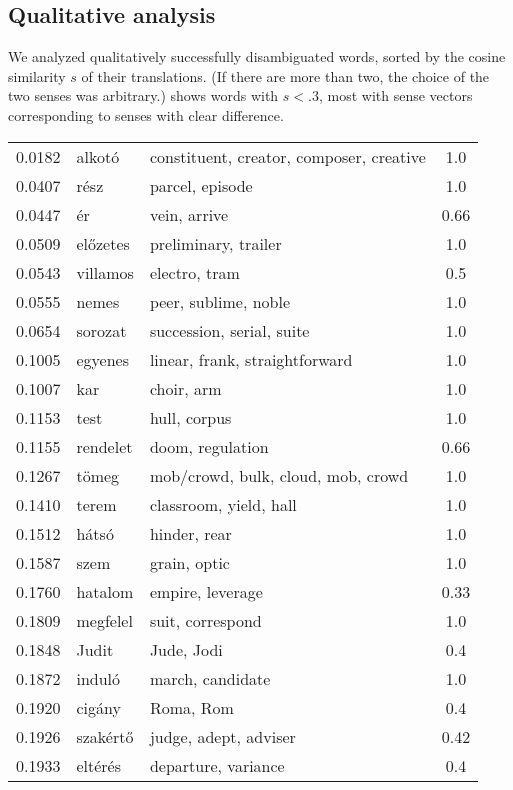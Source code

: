 \documentclass[11pt]{article}
\begin{document}
\subsection{Qualitative analysis}

We analyzed qualitatively successfully disambiguated words, sorted by the
cosine similarity $s$ of their translations.  (If there are more than two, the
choice of the two senses was arbitrary.)  shows words with
$s<.3$, most with sense vectors corresponding to senses with clear difference.

\begin{table*}
  \begin{tabular}{cllc}
  0.0182 & alkotó 	& constituent, creator, composer, creative	&  1.0 \\
  0.0407 & rész 	& parcel, episode	&  1.0 \\
  0.0447 & ér 	& vein, arrive	&  0.66 \\
  0.0509 & előzetes 	& preliminary, trailer	&  1.0 \\
  0.0543 & villamos 	& electro, tram	&  0.5 \\
  0.0555 & nemes 	& peer, sublime, noble	&  1.0 \\
  0.0654 & sorozat 	& succession, serial, suite	&  1.0 \\
  0.1005 & egyenes 	& linear, frank, straightforward	&  1.0 \\
  0.1007 & kar 	& choir, arm	&  1.0 \\
  0.1153 & test 	& hull, corpus	&  1.0 \\
  0.1155 & rendelet 	& doom, regulation	&  0.66 \\
  0.1267 & tömeg 	& mob/crowd, bulk, cloud, mob, crowd	&  1.0 \\
  0.1410 & terem 	& classroom, yield, hall	&  1.0 \\
  0.1512 & hátsó 	& hinder, rear	&  1.0 \\
  0.1587 & szem 	& grain, optic	&  1.0 \\
  0.1760 & hatalom 	& empire, leverage	&  0.33 \\
  0.1809 & megfelel 	& suit, correspond	&  1.0 \\
  0.1848 & Judit 	& Jude, Jodi	&  0.4 \\
  0.1872 & induló 	& march, candidate	&  1.0 \\
  0.1920 & cigány 	& Roma, Rom	&  0.4 \\
  0.1926 & szakértő 	& judge, adept, adviser	& 0.42 \\
  0.1933 & eltérés 	& departure, variance	&  0.4 \\

\end{tabular}
\end{table*}
\end{document}
